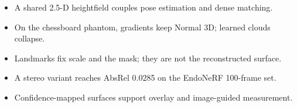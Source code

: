 \begin{itemize}
\item A shared 2.5-D heightfield couples pose estimation and dense matching.
\item On the chessboard phantom, gradients keep Normal 3D; learned clouds collapse.
\item Landmarks fix scale and the mask; they are not the reconstructed surface.
\item A stereo variant reaches AbsRel 0.0285 on the EndoNeRF 100-frame set.
\item Confidence-mapped surfaces support overlay and image-guided measurement.
\end{itemize}
